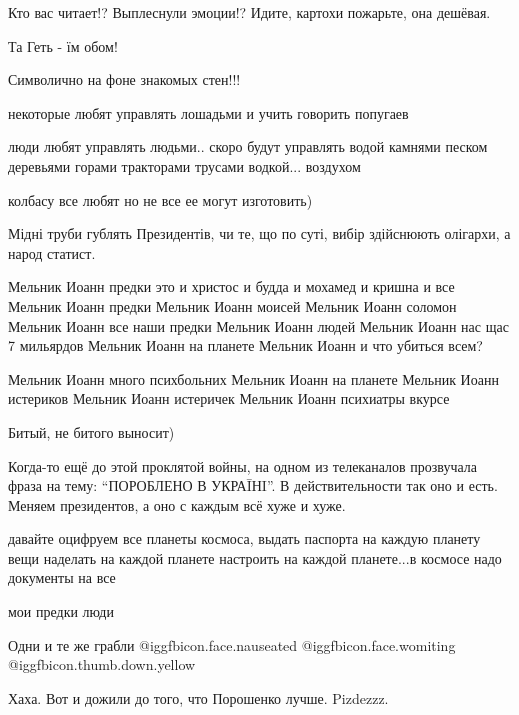 \begin{itemize}
Кто вас читает!? Выплеснули эмоции!? Идите, картохи пожарьте, она дешёвая.

Та Геть - їм обом!

Символично на фоне знакомых стен!!!

некоторые любят управлять лошадьми и учить говорить попугаев


люди любят управлять людьми.. скоро будут управлять водой камнями песком
деревьями горами тракторами трусами водкой... воздухом


колбасу все любят но не все ее могут изготовить)

Мідні труби гублять Президентів, чи те, що по суті, вибір здійснюють олігархи, а народ статист.


\obeycr
Мельник Иоанн
предки это и христос и будда и мохамед и кришна и все
Мельник Иоанн
предки
Мельник Иоанн
моисей
Мельник Иоанн
соломон
Мельник Иоанн
все наши предки
Мельник Иоанн
людей
Мельник Иоанн
нас щас 7 мильярдов
Мельник Иоанн
на планете
Мельник Иоанн
и что убиться всем?
\restorecr


\obeycr
Мельник Иоанн
много психбольних
Мельник Иоанн
на планете
Мельник Иоанн
истериков
Мельник Иоанн
истеричек Мельник Иоанн
психиатры вкурсе
\restorecr

Битый, не битого выносит)


Когда-то ещё до этой проклятой войны, на одном из телеканалов прозвучала фраза
на тему: \enquote{ПОРОБЛЕНО В УКРАĪНI}. В действительности так оно и есть. Меняем
президентов, а оно с каждым всё хуже и хуже.



давайте оцифруем все планеты космоса, выдать паспорта на каждую планету вещи
наделать на каждой планете настроить на каждой планете...в космосе надо
документы на все


мои предки люди

Одни и те же грабли @igg{fbicon.face.nauseated}  @igg{fbicon.face.womiting}  @igg{fbicon.thumb.down.yellow} 

Хаха. Вот и дожили до того, что Порошенко лучше. Pizdezzz.


\end{itemize}
